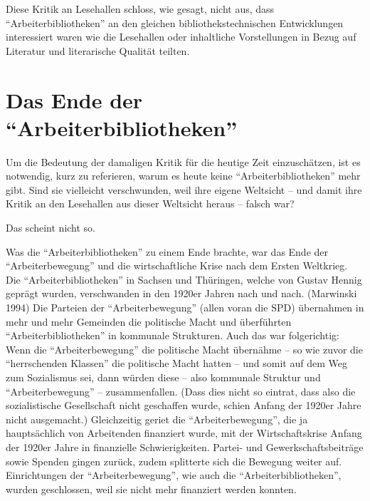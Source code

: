 \documentclass[a4paper,
fontsize=11pt,
oneside,
numbers=noperiodatend,
parskip=half-,
bibliography=totoc,
final
]{scrartcl}
\begin{document}
Diese Kritik an Lesehallen schloss, wie gesagt, nicht aus, dass
\enquote{Arbeiterbibliotheken} an den gleichen bibliothekstechnischen
Entwicklungen interessiert waren wie die Lesehallen oder inhaltliche
Vorstellungen in Bezug auf Literatur und literarische Qualität teilten.

\hypertarget{das-ende-der-arbeiterbibliotheken}{%
\section*{\texorpdfstring{Das Ende der
\enquote{Arbeiterbibliotheken}}{Das Ende der ``Arbeiterbibliotheken''}}\label{das-ende-der-arbeiterbibliotheken}}

Um die Bedeutung der damaligen Kritik für die heutige Zeit
einzuschätzen, ist es notwendig, kurz zu referieren, warum es heute
keine \enquote{Arbeiterbibliotheken} mehr gibt. Sind sie vielleicht
verschwunden, weil ihre eigene Weltsicht -- und damit ihre Kritik an den
Lesehallen aus dieser Weltsicht heraus -- falsch war?

Das scheint nicht so.

Was die \enquote{Arbeiterbibliotheken} zu einem Ende brachte, war das
Ende der \enquote{Arbeiterbewegung} und die wirtschaftliche Krise nach
dem Ersten Weltkrieg. Die \enquote{Arbeiterbibliotheken} in Sachsen und
Thüringen, welche von Gustav Hennig geprägt wurden, verschwanden in den
1920er Jahren nach und nach. (Marwinski 1994) Die Parteien der
\enquote{Arbeiterbewegung} (allen voran die SPD) übernahmen in mehr und
mehr Gemeinden die politische Macht und überführten
\enquote{Arbeiterbibliotheken} in kommunale Strukturen. Auch das war
folgerichtig: Wenn die \enquote{Arbeiterbewegung} die politische Macht
übernähme -- so wie zuvor die \enquote{herrschenden Klassen} die
politische Macht hatten -- und somit auf dem Weg zum Sozialismus sei,
dann würden diese -- also kommunale Struktur und
\enquote{Arbeiterbewegung} -- zusammenfallen. (Dass dies nicht so
eintrat, dass also die sozialistische Gesellschaft nicht geschaffen
wurde, schien Anfang der 1920er Jahre nicht ausgemacht.) Gleichzeitig
geriet die \enquote{Arbeiterbewegung}, die ja hauptsächlich von
Arbeitenden finanziert wurde, mit der Wirtschaftskrise Anfang der 1920er
Jahre in finanzielle Schwierigkeiten. Partei- und Gewerkschaftsbeiträge
sowie Spenden gingen zurück, zudem splitterte sich die Bewegung weiter
auf. Einrichtungen der \enquote{Arbeiterbewegung}, wie auch die
\enquote{Arbeiterbibliotheken}, wurden geschlossen, weil sie nicht mehr
finanziert werden konnten.
\end{document}
